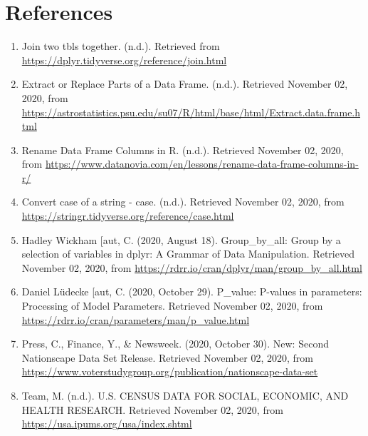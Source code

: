 \documentclass[
]{article}
\begin{document}
\hypertarget{references}{%
\section{References}\label{references}}

\begin{enumerate}
\def\labelenumi{\arabic{enumi}.}
\item
  Join two tbls together. (n.d.). Retrieved from
  \url{https://dplyr.tidyverse.org/reference/join.html}
\item
  Extract or Replace Parts of a Data Frame. (n.d.). Retrieved November
  02, 2020, from
  \url{https://astrostatistics.psu.edu/su07/R/html/base/html/Extract.data.frame.html}
\item
  Rename Data Frame Columns in R. (n.d.). Retrieved November 02, 2020,
  from
  \url{https://www.datanovia.com/en/lessons/rename-data-frame-columns-in-r/}
\item
  Convert case of a string - case. (n.d.). Retrieved November 02, 2020,
  from \url{https://stringr.tidyverse.org/reference/case.html}
\item
  Hadley Wickham {[}aut, C. (2020, August 18). Group\_by\_all: Group by
  a selection of variables in dplyr: A Grammar of Data Manipulation.
  Retrieved November 02, 2020, from
  \url{https://rdrr.io/cran/dplyr/man/group_by_all.html}
\item
  Daniel Lüdecke {[}aut, C. (2020, October 29). P\_value: P-values in
  parameters: Processing of Model Parameters. Retrieved November 02,
  2020, from \url{https://rdrr.io/cran/parameters/man/p_value.html}
\item
  Press, C., Finance, Y., \& Newsweek. (2020, October 30). New: Second
  Nationscape Data Set Release. Retrieved November 02, 2020, from
  \url{https://www.voterstudygroup.org/publication/nationscape-data-set}
\item
  Team, M. (n.d.). U.S. CENSUS DATA FOR SOCIAL, ECONOMIC, AND HEALTH
  RESEARCH. Retrieved November 02, 2020, from
  \url{https://usa.ipums.org/usa/index.shtml}
\end{enumerate}
\end{document}
